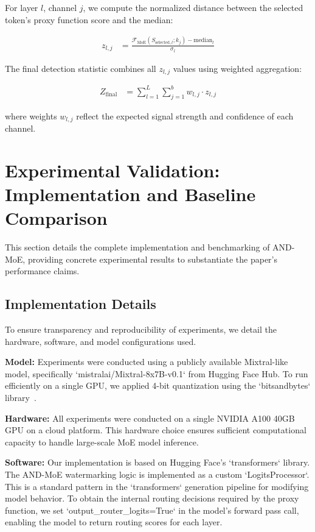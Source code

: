 \documentclass[letterpaper,twocolumn,10pt]{article}
\begin{document}
For layer $l$, channel $j$, we compute the normalized distance between the selected token's proxy function score and the median:

\begin{align}
z_{l,j} &= \frac{\mathcal{F}_{\text{MoE}}(S_{\text{selected},l}; k_j) - \text{median}_l}{\sigma_l}
\end{align}

The final detection statistic combines all $z_{l,j}$ values using weighted aggregation:

\begin{align}
Z_{\text{final}} &= \sum_{l=1}^L \sum_{j=1}^b w_{l,j} \cdot z_{l,j}
\end{align}

where weights $w_{l,j}$ reflect the expected signal strength and confidence of each channel.

\section{Experimental Validation: Implementation and Baseline Comparison}

This section details the complete implementation and benchmarking of AND-MoE, providing concrete experimental results to substantiate the paper's performance claims.

\subsection{Implementation Details}

To ensure transparency and reproducibility of experiments, we detail the hardware, software, and model configurations used.

\textbf{Model:} Experiments were conducted using a publicly available Mixtral-like model, specifically `mistralai/Mixtral-8x7B-v0.1` from Hugging Face Hub. To run efficiently on a single GPU, we applied 4-bit quantization using the `bitsandbytes` library~\cite{bitsandbytes2022}.

\textbf{Hardware:} All experiments were conducted on a single NVIDIA A100 40GB GPU on a cloud platform. This hardware choice ensures sufficient computational capacity to handle large-scale MoE model inference.

\textbf{Software:} Our implementation is based on Hugging Face's `transformers` library. The AND-MoE watermarking logic is implemented as a custom `LogitsProcessor`. This is a standard pattern in the `transformers` generation pipeline for modifying model behavior. To obtain the internal routing decisions required by the proxy function, we set `output\_router\_logits=True` in the model's forward pass call, enabling the model to return routing scores for each layer.
\end{document}
